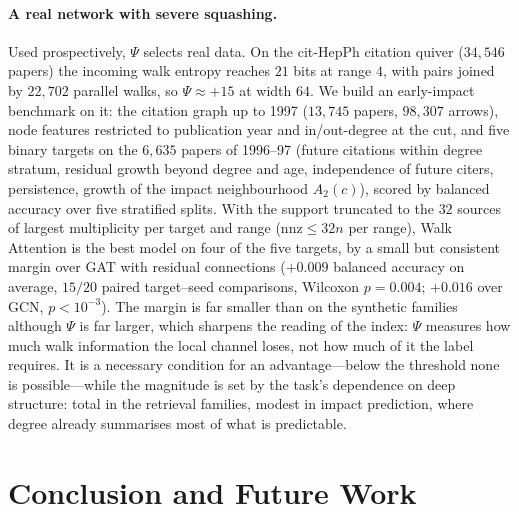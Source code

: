 \documentclass[runningheads]{llncs}
\begin{document}
\paragraph{A real network with severe squashing.}
Used prospectively, $\Psi$ selects real data. On the cit-HepPh citation quiver
\cite{leskovec2005graphs} ($34{,}546$ papers) the incoming walk entropy reaches
$21$ bits at range $4$, with pairs joined by $22{,}702$ parallel walks, so
$\Psi\approx+15$ at width $64$. We build an early-impact benchmark on it: the
citation graph up to 1997 ($13{,}745$ papers, $98{,}307$ arrows), node
features restricted to publication year and in/out-degree at the cut, and five
binary targets on the $6{,}635$ papers of 1996--97 (future citations within
degree stratum, residual growth beyond degree and age, independence of future
citers, persistence, growth of the impact neighbourhood $A_2(c)$), scored by
balanced accuracy over five stratified splits. With the support truncated to
the $32$ sources of largest multiplicity per target and range
($\mathrm{nnz}\le32n$ per range), Walk Attention is the best model on four of
the five targets, by a small but consistent margin over GAT with residual
connections ($+0.009$ balanced accuracy on average, $15/20$ paired
target--seed comparisons, Wilcoxon $p=0.004$; $+0.016$ over GCN,
$p<10^{-3}$). The margin is far smaller than on the synthetic families although
$\Psi$ is far larger, which sharpens the reading of the index: $\Psi$ measures
how much walk information the local channel loses, not how much of it the
label requires. It is a necessary condition for an advantage---below the
threshold none is possible---while the magnitude is set by the task's
dependence on deep structure: total in the retrieval families, modest in impact
prediction, where degree already summarises most of what is predictable.

\section{Conclusion and Future Work}\label{sec:conclusion}
\end{document}
